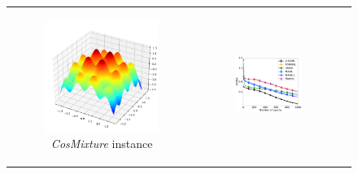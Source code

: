 \begin{figure}[t]
	\centering
	\setlength\tabcolsep{0.01pt}
	\captionsetup[subfigure]{aboveskip=0pt,belowskip=0pt}
	\begin{tabular}[c]{ccc}
		\begin{subfigure}[t]{0.32\textwidth}
			\centering
			\includegraphics[width=\textwidth]{./figs/CosMixture2D.pdf}
			\caption{\small \textit{CosMixture} instance} \label{fig:CosMixture-ins}
		\end{subfigure} 
		&
		\begin{subfigure}[t]{0.32\textwidth}
			\centering
			\includegraphics[width=\textwidth]{./figs/new/CosMixture2D-50shot-50query-200inners-eps-converted-to.pdf}

\end{subfigure}
\end{tabular}
\end{figure}
